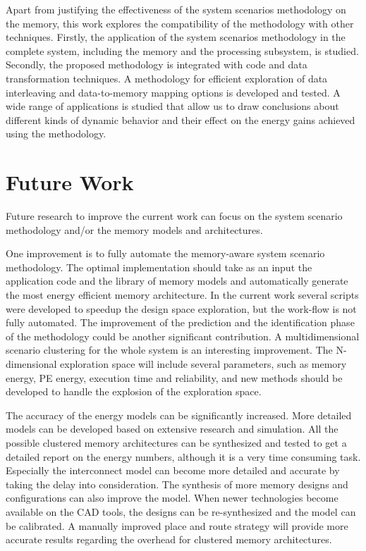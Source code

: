 Apart from justifying the effectiveness of the system scenarios methodology on the memory, this work explores the compatibility of the methodology with other techniques.
Firstly, the application of the system scenarios methodology in the complete system, including the memory and the processing subsystem, is studied.
Secondly, the proposed methodology is integrated with code and data transformation techniques.
A methodology for efficient exploration of data interleaving and data-to-memory mapping options is developed and tested.
A wide range of applications is studied that allow us to draw conclusions about different kinds of dynamic behavior and their effect on the energy gains achieved using the methodology. 

\section{Future Work}

Future research to improve the current work can focus on the system scenario methodology and/or the memory models and architectures.

One improvement is to fully automate the memory-aware system scenario methodology.
The optimal implementation should take as an input the application code and the library of memory models and automatically generate the most energy efficient memory architecture.
In the current work several scripts were developed to speedup the design space exploration, but the work-flow is not fully automated.
The improvement of the prediction and the identification phase of the methodology could be another significant contribution. 
A multidimensional scenario clustering for the whole system is an interesting improvement.
The N-dimensional exploration space will include several parameters, such as memory energy, PE energy, execution time and reliability, and new methods should be developed to handle the explosion of the exploration space.

The accuracy of the energy models can be significantly increased.
More detailed models can be developed based on extensive research and simulation.
All the possible clustered memory architectures can be synthesized and tested to get a detailed report on the energy numbers, although it is a very time consuming task.
Especially the interconnect model can become more detailed and accurate by taking the delay into consideration.
The synthesis of more memory designs and configurations can also improve the model.
When newer technologies become available on the CAD tools, the designs can be re-synthesized and the model can be calibrated.
A manually improved place and route strategy will provide more accurate results regarding the overhead for clustered memory architectures.

